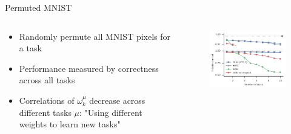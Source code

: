 \documentclass{beamer}
\begin{document}
\begin{frame}{Permuted MNIST}
	\begin{columns}
		\begin{column}{0.5\textwidth}
			\begin{itemize}
			\item Randomly permute all MNIST pixels for a task
			\item Performance measured by correctness across all tasks
			\item<2-> Correlations of $\omega_k^\mu$ decrease across different tasks $\mu$: "Using different weights to learn new tasks"
		\end{itemize}
		\end{column}
		\begin{column}{0.5\textwidth}
			\begin{figure}
				
				\centering
				\includegraphics[width=\textwidth]{ML2}
			\end{figure}
		\end{column}
	\end{columns}

\end{frame}
\end{document}
